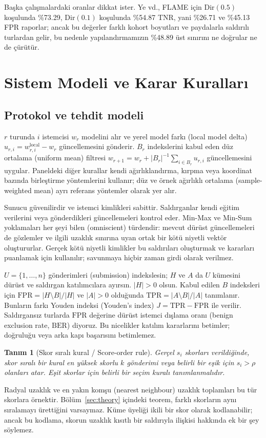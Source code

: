 \documentclass[journal]{IEEEtran}
\newtheorem{definition}{Tanım}
\newcommand{\BER}{\mathrm{BER}}
\begin{document}
Başka çalışmalardaki oranlar dikkat ister. Ye vd., FLAME için $\mathrm{Dir}(0.5)$ koşulunda \%73.29, $\mathrm{Dir}(0.1)$ koşulunda \%54.87 TNR, yani \%26.71 ve \%45.13 FPR raporlar; ancak bu değerler farklı kohort boyutları ve paydalarla saldırılı turlardan gelir, bu nedenle yapılandırmamızın \%48.89 üst sınırını ne doğrular ne de çürütür.

\section{Sistem Modeli ve Karar Kuralları}\label{sec:model}
\subsection{Protokol ve tehdit modeli}
$r$ turunda $i$ istemcisi $w_r$ modelini alır ve yerel model farkı (local model delta) $u_{r,i}=w^{\mathrm{local}}_{r,i}-w_r$ güncellemesini gönderir. $B_r$ indekslerini kabul eden düz ortalama (uniform mean) filtresi $w_{r+1}=w_r+|B_r|^{-1}\sum_{i\in B_r}u_{r,i}$ güncellemesini uygular. Paneldeki diğer kurallar kendi ağırlıklandırma, kırpma veya koordinat bazında birleştirme yöntemlerini kullanır; düz ve örnek ağırlıklı ortalama (sample-weighted mean) ayrı referans yöntemler olarak yer alır.

Sunucu güvenilirdir ve istemci kimlikleri sabittir. Saldırganlar kendi eğitim verilerini veya gönderdikleri güncellemeleri kontrol eder. Min-Max ve Min-Sum yoklamaları her şeyi bilen (omniscient) türdendir: mevcut dürüst güncellemeleri de gözlemler ve ilgili uzaklık sınırına uyan ortak bir kötü niyetli vektör oluştururlar. Gerçek kötü niyetli kimlikler bu saldırıları oluşturmak ve kararları puanlamak için kullanılır; savunmaya hiçbir zaman girdi olarak verilmez.

$U=\{1,\ldots,n\}$ gönderimleri (submission) indekslesin; $H$ ve $A$ da $U$ kümesini dürüst ve saldırgan katılımcılara ayırsın. $|H|>0$ olsun. Kabul edilen $B$ indeksleri için $\mathrm{FPR}=|H\setminus B|/|H|$ ve $|A|>0$ olduğunda $\mathrm{TPR}=|A\setminus B|/|A|$ tanımlanır. Bunların farkı Youden indeksi (Youden's index) $J=\mathrm{TPR}-\mathrm{FPR}$ ile verilir. Saldırgansız turlarda $\mathrm{FPR}$ değerine dürüst istemci dışlama oranı (benign exclusion rate, $\BER$) diyoruz. Bu nicelikler katılım kararlarını betimler; doğruluğu veya arka kapı başarısını betimlemez.

\begin{definition}[Skor sıralı kural / Score-order rule]\label{def:dispersion}
Gerçel $s_i$ skorları verildiğinde, skor sıralı bir kural en yüksek skorlu $k$ gönderimi veya belirli bir eşik için $s_i>\rho$ olanları atar. Eşit skorlar için belirli bir seçim kuralı tanımlanmalıdır.
\end{definition}
Radyal uzaklık ve en yakın komşu (nearest neighbour) uzaklık toplamları bu tür skorlara örnektir. Bölüm~\ref{sec:theory} içindeki teorem, farklı skorların aynı sıralamayı ürettiğini varsaymaz. Küme üyeliği ikili bir skor olarak kodlanabilir; ancak bu kodlama, skorun uzaklık kısıtlı bir saldırıyla ilişkisi hakkında ek bir şey söylemez.
\end{document}
